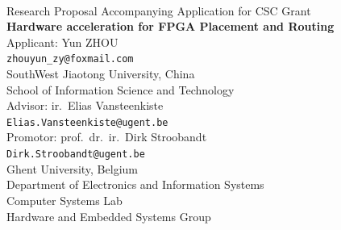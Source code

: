 \documentclass[a4paper,oneside,12pt]{article}
\begin{document}

\thispagestyle{empty}

\begin{center}
\mbox{}\\\vspace{5mm}
{\large Research Proposal Accompanying Application for CSC Grant}\\ [45mm]
%
{\bf\Large Hardware acceleration for FPGA Placement and Routing} \\
\vspace{45mm}
\large Applicant: Yun ZHOU \\
\vspace{2mm}
\small\texttt{zhouyun\_zy@foxmail.com} \\
\vspace{10mm}
\normalsize SouthWest Jiaotong University, China \\
\normalsize School of Information Science and Technology\\
\vspace{10mm}
\large Advisor: ir.\ Elias Vansteenkiste \\
\small\texttt{Elias.Vansteenkiste@ugent.be} \\
\vspace{2mm}
\large Promotor: prof.\ dr.\ ir.\ Dirk Stroobandt \\
\small\texttt{Dirk.Stroobandt@ugent.be} \\
\vspace{10mm}
\normalsize Ghent University, Belgium \\
\normalsize Department of Electronics and Information Systems\\
\normalsize Computer Systems Lab\\
\normalsize Hardware and Embedded Systems Group
\end{center}

\newpage

\tableofcontents
\end{document}
